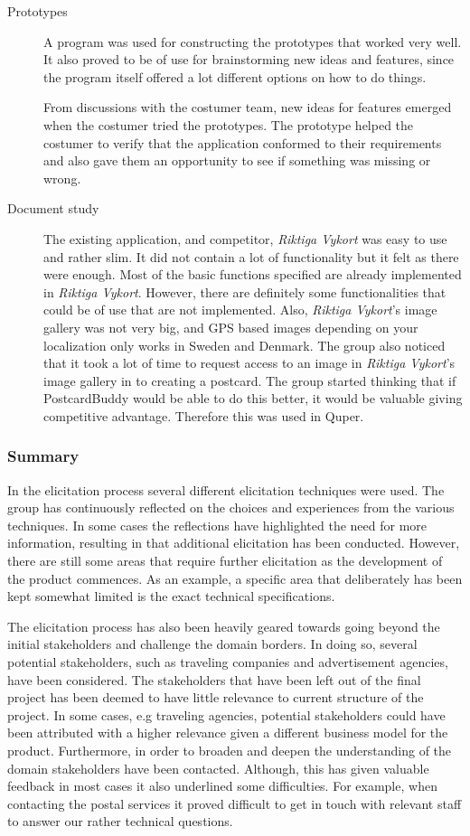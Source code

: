 \documentclass[10pt,a4paper]{article}
\begin{document}
\begin{description}
\item[Prototypes] A program was used for constructing the prototypes that worked very well. It also proved to be of use for brainstorming new ideas and features, since the program itself offered a lot different options on how to do things. 

From discussions with the costumer team, new ideas for features emerged when the costumer tried the prototypes. The prototype helped the costumer to verify that the application conformed to their requirements and also gave them an opportunity to see if something was missing or wrong.

\item[Document study] The existing application, and competitor, \textit{Riktiga Vykort} was easy to use and rather slim. It did not contain a lot of functionality but it felt as there were enough. Most of the basic functions specified are already implemented in \textit{Riktiga Vykort}. However, there are definitely some functionalities that could be of use that are not implemented. Also, \textit{Riktiga Vykort}'s image gallery was not very big, and GPS based images depending on your localization only works in Sweden and Denmark. The group also noticed that it took a lot of time to request access to an image in \textit{Riktiga Vykort}'s image gallery in to creating a postcard. The group started thinking that if PostcardBuddy would be able to do this better, it would be valuable giving competitive advantage. Therefore this was used in Quper.
\end{description}
\subsubsection*{Summary} In the elicitation process several different elicitation techniques were used. The group has continuously reflected on the choices and experiences from the various techniques. In some cases the reflections have highlighted the need for more information, resulting in that additional elicitation has been conducted. However, there are still some areas that require further elicitation as the development of the product commences. As an example, a specific area that deliberately has been kept somewhat limited is the exact technical specifications. 

The elicitation process has also been heavily geared towards going beyond the initial stakeholders and challenge the domain borders. In doing so, several potential stakeholders, such as traveling companies and advertisement agencies, have been considered. The stakeholders that have been left out of the final project has been deemed to have little relevance to current structure of the project. In some cases, e.g traveling agencies, potential stakeholders could have been attributed with a higher relevance given a different business model for the product. Furthermore, in order to broaden and deepen the understanding of the domain stakeholders have been contacted. Although, this has given valuable feedback in most cases it also underlined some difficulties. For example, when contacting the postal services it proved difficult to get in touch with relevant staff to answer our rather technical questions. 
\end{document}
